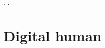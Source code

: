 


\graphicspath{
{images/summer_school_study/png/}
{images/summer_school_study/}
{images/summer_school_study/plots/}
{images/summer_school_study/2018/}
{images/fiber_creation/}
{images/motor_unit_assignment/}
}



\newcommand{\opendihu}{OpenDiHu}.
\newcommand{\Opendihu}{OpenDiHu}.
 
\tableofcontents


%  
\part{Digital human}

%

